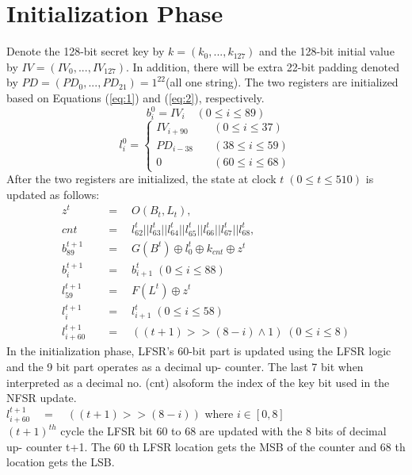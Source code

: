 \section{Initialization Phase}
Denote the 128-bit secret key by $k = (k_0 , . . . , k_{127} )$ and the 128-bit initial value by
$IV = (IV_0 , . . . , IV_{127} )$. In addition, there will be extra 22-bit padding denoted by $P D = (P D_0 , . . . , P D_{21} ) = 1^{22} $(all one string). The two registers are initialized based on Equations
(\ref{eq:1}) and (\ref{eq:2}), respectively.
\begin{equation}\label{eq:1}
	b^0_i = IV_i  \quad (0 \leq i \leq 89)
\end{equation}
\begin{equation}\label{eq:2}
l_i^0 = \left\{\begin{matrix}
IV_{i+90}& \quad (0 \leq i \leq 37) \\ 
PD_{i-38}&\quad (38 \leq i \leq 59) \\
0 & \quad (60 \leq i \leq 68)
\end{matrix}\right.
\end{equation}
After the two registers are initialized, the state at clock $t\; (0 \leq t \leq 510)$ is updated as
follows:
\begin{align*}
z^t \quad &= \quad O(B_t,L_t),\\ 
cnt \quad &= \quad l^t_{62}||l^t_{63}||l^t_{64}||l^t_{65}||l^t_{66}||l^t_{67}||l^t_{68}, \\ 
b^{t+1}_{89} \quad &= \quad G(B^t)\oplus l^t_{0} \oplus k_{cnt} \oplus z^t  \\ 
b^{t+1}_{i} \quad &= \quad b^{t}_{i+1} \; (0 \leq i \leq 88)\\ 
l^{t+1}_{59} \quad &= \quad F(L^t) \oplus z^t\\
l^{t+1}_{i} \quad &= \quad l^{t}_{i+1} \; (0 \leq i \leq 58)\\
l^{t+1}_{i+60} \quad &= \quad ((t+1)>>(8-i) \land  1) \; (0 \leq i \leq 8)
\end{align*}
In the initialization phase, LFSR’s 60-bit
part is updated using the LFSR logic and
the 9 bit part operates as a decimal up-
counter. The last 7 bit when
interpreted as a decimal no. (cnt) alsoform the index of the key bit used in
the NFSR update.\\[2mm]

$l^{t+1}_{i+60} \quad = \quad ((t+1)>>(8-i))$  where $i \in [0,8] $
\\[2mm]
$(t+1)^{th}$ cycle the LFSR bit 60 to 68 are
updated with the 8 bits of decimal up-
counter t+1. The 60 th LFSR location gets
the MSB of the counter and 68 th
location gets the LSB.
